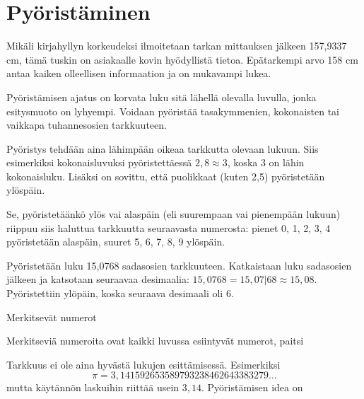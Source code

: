 \section{Pyöristäminen}

Mikäli kirjahyllyn korkeudeksi ilmoitetaan tarkan mittauksen jälkeen 157,9337 cm, tämä tuskin on asiakaalle kovin hyödyllistä tietoa. Epätarkempi arvo 158 cm antaa kaiken olleellisen informaation ja on mukavampi lukea.

Pyöristämisen ajatus on korvata luku sitä lähellä olevalla luvulla, jonka esitysmuoto on lyhyempi. Voidaan pyöristää
tasakymmenien, kokonaisten tai vaikkapa tuhannesosien
tarkkuuteen.

Pyöristys tehdään aina lähimpään oikeaa tarkkutta olevaan lukuun. Siis esimerkiksi kokonaisluvuksi pyöristettäessä $2,8 \approx 3$, koska 3 on lähin kokonaisluku. Lisäksi on sovittu, että
puolikkaat (kuten 2,5) pyöristetään ylöspäin.

Se, pyöristetäänkö ylös vai alaspäin (eli suurempaan vai
pienempään lukuun) riippuu siis haluttua tarkkuutta
seuraavasta numerosta: pienet
0, 1, 2, 3, 4 pyöristetään alaspäin, suuret 5, 6, 7, 8, 9 ylöspäin.

\begin{esimerkki}
Pyöristetään luku 15,0768 sadasosien tarkkuuteen. Katkaistaan
luku sadasosien jälkeen ja katsotaan seuraavaa desimaalia:
$15,0768 = 15,07|68 \approx 15,08$.
Pyöristettiin ylöpäin, koska seuraava desimaali oli 6.
\end{esimerkki}

Merkitsevät numerot

Merkitseviä numeroita ovat kaikki luvussa esiintyvät numerot, paitsi 

Tarkkuus ei ole aina hyvästä lukujen esittämisessä. Esimerkiksi
\[ \pi = 3,141592653589793238462643383279 \ldots \]
mutta käytännön laskuihin riittää usein $3,14$. Pyöristämisen idea on 